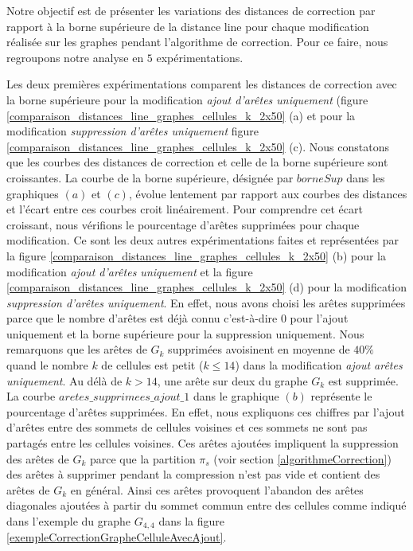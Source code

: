Notre objectif est de pr\'esenter les variations des distances de correction par rapport \`a la borne sup\'erieure de la distance line pour chaque modification r\'ealis\'ee sur les graphes pendant l'algorithme de correction. Pour ce faire, nous regroupons notre analyse en $5$ exp\'erimentations.
\newline

Les deux premi\`eres exp\'erimentations comparent les distances de correction avec la borne sup\'erieure pour la modification {\em ajout d'ar\^etes uniquement} (figure \ref{comparaison_distances_line_graphes_cellules_k_2x50} (a) et 
pour la modification {\em suppression d'ar\^etes uniquement} figure \ref{comparaison_distances_line_graphes_cellules_k_2x50} (c).
Nous constatons que les courbes des distances de correction et celle de la borne sup\'erieure sont croissantes. 
La courbe de la borne sup\'erieure, d\'esign\'ee par $borneSup$ dans les graphiques $(a)$ et $(c)$, \'evolue lentement par rapport aux courbes des distances et l'\'ecart entre ces courbes croit lin\'eairement. 
Pour comprendre cet \'ecart croissant, nous v\'erifions le pourcentage d'ar\^etes  supprim\'ees pour chaque modification.  Ce sont les deux autres exp\'erimentations faites et repr\'esent\'ees par la figure 
\ref{comparaison_distances_line_graphes_cellules_k_2x50} (b) pour la modification {\em ajout d'ar\^etes uniquement} et
 la figure \ref{comparaison_distances_line_graphes_cellules_k_2x50} (d) pour la modification 
{\em suppression d'ar\^etes uniquement}. 
En effet, nous avons choisi les ar\^etes supprim\'ees parce que le nombre d'ar\^etes est d\'ej\`a connu c'est-\`a-dire $0$ pour l'ajout uniquement et la borne sup\'erieure pour la suppression uniquement. 
\newline
Nous remarquons que les ar\^etes   de $G_k$ supprim\'ees avoisinent en moyenne de
$40\%$ quand le nombre $k$ de cellules est petit ($k\le14$) dans la modification {\em ajout ar\^etes uniquement}. Au d\'el\`a de $k > 14$, une ar\^ete sur deux du graphe $G_{k}$ est supprim\'ee. La courbe  $aretes\_supprimees\_ajout\_1$ dans le graphique $(b)$ repr\'esente le pourcentage d'ar\^etes supprim\'ees.  
En effet, nous expliquons ces chiffres  par l'ajout d'ar\^etes entre des sommets de cellules voisines et ces sommets ne sont pas partag\'es entre les cellules voisines. Ces ar\^etes ajout\'ees impliquent la suppression des ar\^etes de $G_k$ parce que la partition $\pi_s$ (voir section \ref{algorithmeCorrection}) des ar\^etes \`a supprimer pendant la compression n'est pas vide et contient des ar\^etes de $G_k$ en g\'en\'eral. Ainsi ces ar\^etes provoquent l'abandon des ar\^etes diagonales  ajout\'ees \`a partir du sommet commun entre des cellules comme indiqu\'e dans l'exemple du graphe $G_{4,4}$ dans la figure \ref{exempleCorrectionGrapheCelluleAvecAjout}.
